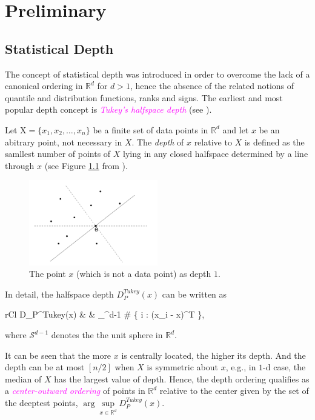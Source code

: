 \chapter{Preliminary}

\setcounter{page}{1}

\section{Statistical Depth}
The concept of statistical depth was introduced in order to overcome the lack of a canonical ordering in $\mathbb{R}^d$ for $d > 1$, hence the absence of the related notions of quantile and distribution functions, ranks and signs. The earliest and most popular depth concept is \textit{\textcolor{magenta}{Tukey's halfspace depth}} (see \cite{tukey1975mathematics}).
\begin{definition}
Let $\mathrm{X} = \{x_1, x_2, \dots, x_n\}$ be a finite set of data points in $\mathbb{R}^d$ and let $x$ be an abitrary point, not necessary in $X$. The \textit{depth} of $x$ relative to $X$ is defined as the samllest number of points of $X$ lying in any closed halfspace determined by a line through $x$ (see Figure \ref{fg: depth} from \cite{miller2003efficient}).
\end{definition}

\begin{figure}
	\centering
\includegraphics[width=0.5\textwidth]{Figures/IntuitionDepth.png}
\caption{The point $x$ (which is not a data point) as depth $1$.}
\label{fg: depth}
\end{figure}
\begin{remark}
	In detail, the halfspace depth $D_{P}^{Tukey}(x)$ can be written as 
	\begin{IEEEeqnarray}{rCl}
		D_{P}^{Tukey}(x) & \triangleq & \min_{\phi \in {}^{d-1}} \# \left\{ i : \left(x_i - x\right)^T \phi {} \right\}, \nonumber
	\end{IEEEeqnarray}
where $\mathcal{S}^{d-1}$ denotes the the unit sphere in $\mathbb{R}^d$. 
\end{remark}
\begin{remark}
	It can be seen that the more $x$ is centrally located, the higher its depth. And the depth can be at most $[n/2]$ when $X$ is symmetric about $x$, e.g., in $1$-d case, the median of $X$ has the largest value of depth. Hence, the depth ordering qualifies as a \textit{\textcolor{magenta}{center-outward ordering}} of points in $\mathbb{R}^d$ relative to the center given by the set of the deeptest points, $\arg\sup\limits_{x \in \mathbb{R}^d}D_P^{Tukey}(x)$. 
\end{remark}

